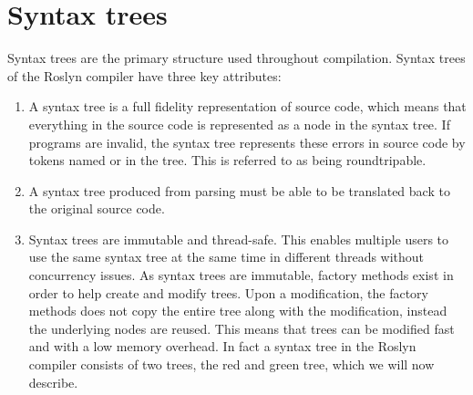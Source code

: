 \section{Syntax trees}\label{sec:syntax_trees}
Syntax trees are the primary structure used throughout compilation. Syntax trees of the Roslyn compiler have three key attributes\cite[p. 6]{ng2012roslyn}: 
\begin{enumerate}
	\item A syntax tree is a full fidelity representation of source code, which means that everything in the source code is represented as a node in the syntax tree. If programs are invalid, the syntax tree represents these errors in source code by tokens named  or  in the tree.  This is referred to as being roundtripable.
	\item A syntax tree produced from parsing must be able to be translated back to the original source code.
	\item Syntax trees are immutable and thread-safe. This enables multiple users to use the same syntax tree at the same time in different threads without concurrency issues. As syntax trees are immutable, factory methods exist in order to help create and modify trees. Upon a modification, the factory methods does not copy the entire tree along with the modification, instead the underlying nodes are reused. This means that trees can be modified fast and with a low memory overhead. In fact a syntax tree in the Roslyn compiler consists of two trees, the red and green tree, which we will now describe.
\end{enumerate}

